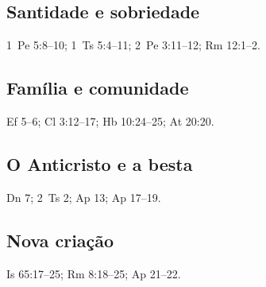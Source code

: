 \subsection*{Santidade e sobriedade}
1~Pe 5:8--10; 1~Ts 5:4--11; 2~Pe 3:11--12; Rm 12:1--2.

\subsection*{Família e comunidade}
Ef 5--6; Cl 3:12--17; Hb 10:24--25; At 20:20.

\subsection*{O Anticristo e a besta}
Dn 7; 2~Ts 2; Ap 13; Ap 17--19.

\subsection*{Nova criação}
Is 65:17--25; Rm 8:18--25; Ap 21--22.
